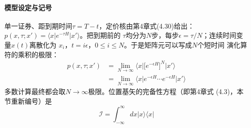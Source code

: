 \paragraph{模型设定与记号}
单一证券、距到期时间$\tau=T-t$，定价核由第4章式(4.30)给出：
$p(x,\tau;x')=\langle x\vert e^{-\tau H}\vert x'\rangle$。把到期前的
$\tau$均分为$N$步，每步$\epsilon=\tau/N$；连续时间变量$x(t)$离散化为
$x_i$，$t=i\epsilon$，$0\leq i\leq N$。于是矩阵元可以写成$N$个短时间
演化算符的乘积的极限：
\begin{align*}
p(x,\tau;x')&=\lim_{N\to\infty}\langle x\vert\bigl[e^{-\epsilon H}\bigr]^{N}\vert x'\rangle\\
&=\lim_{N\to\infty}\langle x\vert e^{-\epsilon H}\cdots e^{-\epsilon H}\vert x'\rangle
\tag{5.1}
\end{align*}
多数计算最终都会取$N\to\infty$极限。位置基矢的完备性方程（即第4章式
(4.3)，本节重新编号）是
\begin{equation*}
\mathcal{I}=\int_{-\infty}^{\infty}dx\vert x\rangle\langle x\vert
\tag{5.2}
\end{equation*}

